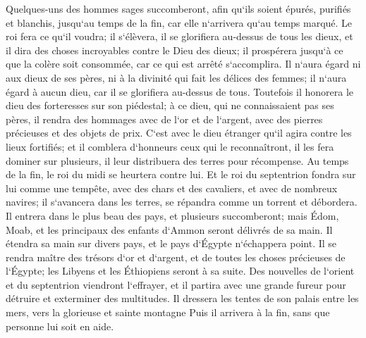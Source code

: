 \verse Quelques-uns des hommes sages succomberont, afin qu`ils soient épurés, purifiés et blanchis, jusqu`au temps de la fin, car elle n`arrivera qu`au temps marqué. 
\verse Le roi fera ce qu`il voudra; il s`élèvera, il se glorifiera au-dessus de tous les dieux, et il dira des choses incroyables contre le Dieu des dieux; il prospérera jusqu`à ce que la colère soit consommée, car ce qui est arrêté s`accomplira. 
\verse Il n`aura égard ni aux dieux de ses pères, ni à la divinité qui fait les délices des femmes; il n`aura égard à aucun dieu, car il se glorifiera au-dessus de tous. 
\verse Toutefois il honorera le dieu des forteresses sur son piédestal; à ce dieu, qui ne connaissaient pas ses pères, il rendra des hommages avec de l`or et de l`argent, avec des pierres précieuses et des objets de prix. 
\verse C`est avec le dieu étranger qu`il agira contre les lieux fortifiés; et il comblera d`honneurs ceux qui le reconnaîtront, il les fera dominer sur plusieurs, il leur distribuera des terres pour récompense. 
\verse Au temps de la fin, le roi du midi se heurtera contre lui. Et le roi du septentrion fondra sur lui comme une tempête, avec des chars et des cavaliers, et avec de nombreux navires; il s`avancera dans les terres, se répandra comme un torrent et débordera. 
\verse Il entrera dans le plus beau des pays, et plusieurs succomberont; mais Édom, Moab, et les principaux des enfants d`Ammon seront délivrés de sa main. 
\verse Il étendra sa main sur divers pays, et le pays d`Égypte n`échappera point. 
\verse Il se rendra maître des trésors d`or et d`argent, et de toutes les choses précieuses de l`Égypte; les Libyens et les Éthiopiens seront à sa suite. 
\verse Des nouvelles de l`orient et du septentrion viendront l`effrayer, et il partira avec une grande fureur pour détruire et exterminer des multitudes. 
\verse Il dressera les tentes de son palais entre les mers, vers la glorieuse et sainte montagne Puis il arrivera à la fin, sans que personne lui soit en aide. 

